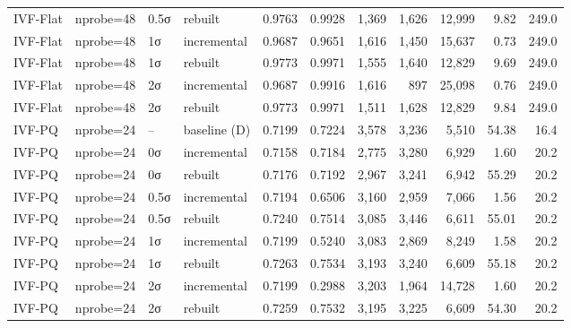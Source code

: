 \begin{table}[t]
\begin{tabular}{llllrrrrrrr}
IVF-Flat & nprobe=48 & 0.5σ & rebuilt & 0.9763 & 0.9928 & 1,369 & 1,626 & 12,999 & 9.82 & 249.0 \\
IVF-Flat & nprobe=48 & 1σ & incremental & 0.9687 & 0.9651 & 1,616 & 1,450 & 15,637 & 0.73 & 249.0 \\
IVF-Flat & nprobe=48 & 1σ & rebuilt & 0.9773 & 0.9971 & 1,555 & 1,640 & 12,829 & 9.69 & 249.0 \\
IVF-Flat & nprobe=48 & 2σ & incremental & 0.9687 & 0.9916 & 1,616 & 897 & 25,098 & 0.76 & 249.0 \\
IVF-Flat & nprobe=48 & 2σ & rebuilt & 0.9773 & 0.9971 & 1,511 & 1,628 & 12,829 & 9.84 & 249.0 \\
IVF-PQ & nprobe=24 & -- & baseline (D) & 0.7199 & 0.7224 & 3,578 & 3,236 & 5,510 & 54.38 & 16.4 \\
IVF-PQ & nprobe=24 & 0σ & incremental & 0.7158 & 0.7184 & 2,775 & 3,280 & 6,929 & 1.60 & 20.2 \\
IVF-PQ & nprobe=24 & 0σ & rebuilt & 0.7176 & 0.7192 & 2,967 & 3,241 & 6,942 & 55.29 & 20.2 \\
IVF-PQ & nprobe=24 & 0.5σ & incremental & 0.7194 & 0.6506 & 3,160 & 2,959 & 7,066 & 1.56 & 20.2 \\
IVF-PQ & nprobe=24 & 0.5σ & rebuilt & 0.7240 & 0.7514 & 3,085 & 3,446 & 6,611 & 55.01 & 20.2 \\
IVF-PQ & nprobe=24 & 1σ & incremental & 0.7199 & 0.5240 & 3,083 & 2,869 & 8,249 & 1.58 & 20.2 \\
IVF-PQ & nprobe=24 & 1σ & rebuilt & 0.7263 & 0.7534 & 3,193 & 3,240 & 6,609 & 55.18 & 20.2 \\
IVF-PQ & nprobe=24 & 2σ & incremental & 0.7199 & 0.2988 & 3,203 & 1,964 & 14,728 & 1.60 & 20.2 \\
IVF-PQ & nprobe=24 & 2σ & rebuilt & 0.7259 & 0.7532 & 3,195 & 3,225 & 6,609 & 54.30 & 20.2 \\
\bottomrule
\end{tabular}
\end{table}

